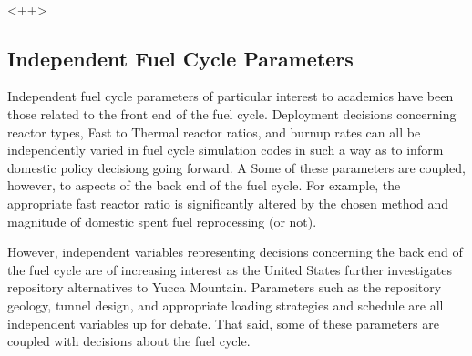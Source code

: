 \paragraph{}<++>
\subsection{Independent Fuel Cycle Parameters}
Independent fuel cycle parameters of particular interest to academics have been those related to the front end of the fuel cycle. Deployment decisions concerning reactor types, Fast to Thermal reactor ratios, and burnup rates can all be independently varied in fuel cycle simulation codes in such a way as to inform domestic policy decisiong going forward. A Some of these parameters are coupled, however, to aspects of the back end of the fuel cycle. For example, the appropriate fast reactor ratio is significantly altered by the chosen method and magnitude of domestic spent fuel reprocessing (or not).

However, independent variables representing decisions concerning the back end of the fuel cycle are of increasing interest as the United States further investigates repository alternatives to Yucca Mountain. Parameters such as the repository geology, tunnel design, and appropriate loading strategies and schedule are all independent variables up for debate. That said, some of these parameters are coupled with decisions about the fuel cycle. 

